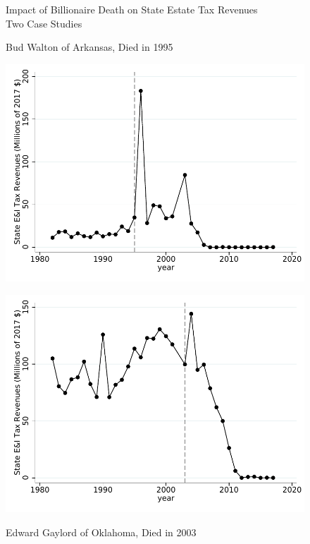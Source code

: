 \documentclass[12pt]{article}
\begin{document}
\begin{figure}
	\centering
	\caption{Impact of Billionaire Death on State Estate Tax Revenues\\Two Case Studies}	
	\caption*{Bud Walton of Arkansas, Died in 1995}
	\includegraphics[width=.8\textwidth]{../Figures/Figure3_a.pdf}
    \vspace{10pt}
	\caption*{Edward Gaylord of Oklahoma, Died in 2003}
	\includegraphics[width=.8\textwidth]{../Figures/Figure3_b.pdf}
\label{fig:case_studies}
\end{figure}
\end{document}
